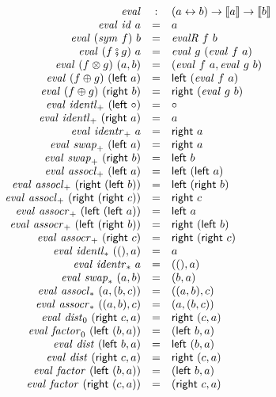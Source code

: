 \documentclass[11pt]{article}
\newcommand{\dt}[1]{\llbracket #1 \rrbracket}
\newcommand{\leftv}[1]{\textsf{left}~#1}
\newcommand{\rightv}[1]{\textsf{right}~#1}
\newcommand{\iso}{\leftrightarrow}
\newcommand{\identlp}{\mathit{identl}_+}
\newcommand{\identrp}{\mathit{identr}_+}
\newcommand{\swapp}{\mathit{swap}_+}
\newcommand{\assoclp}{\mathit{assocl}_+}
\newcommand{\assocrp}{\mathit{assocr}_+}
\newcommand{\identlt}{\mathit{identl}_*}
\newcommand{\identrt}{\mathit{identr}_*}
\newcommand{\swapt}{\mathit{swap}_*}
\newcommand{\assoclt}{\mathit{assocl}_*}
\newcommand{\assocrt}{\mathit{assocr}_*}
\newcommand{\distz}{\mathit{dist}_0}
\newcommand{\factorz}{\mathit{factor}_0}
\newcommand{\dist}{\mathit{dist}}
\newcommand{\factor}{\mathit{factor}}
\newcommand{\idc}{\mathit{id}}
\newcommand{\symc}[1]{\mathit{sym}~#1}
\begin{document}
\[\begin{array}{rcl}
\mathit{eval} &:& (a \iso b) \rightarrow \dt{a} \rightarrow \dt{b} \\
\mathit{eval}~\idc~a &=& a \\
\mathit{eval}~(\symc{f})~b &=& \mathit{evalR}~f~b \\
\mathit{eval}~(f \fatsemi g)~a &=& \mathit{eval}~g~(\mathit{eval}~f~a) \\
\mathit{eval}~(f \otimes g)~(a,b) &=& (\mathit{eval}~f~a, \mathit{eval}~g~b) \\
\mathit{eval}~(f \oplus g)~(\leftv{a}) &=& \leftv{(\mathit{eval}~f~a)} \\
\mathit{eval}~(f \oplus g)~(\rightv{b}) &=& \rightv{(\mathit{eval}~g~b)} \\
\mathit{eval}~\identlp~(\leftv{\circ}) &=& \circ \\
\mathit{eval}~\identlp~(\rightv{a}) &=& a \\
\mathit{eval}~\identrp~a &=& \rightv{a} \\
\mathit{eval}~\swapp~(\leftv{a}) &=& \rightv{a} \\
\mathit{eval}~\swapp~(\rightv{b}) &=& \leftv{b} \\
\mathit{eval}~\assoclp~(\leftv{a}) &=& \leftv{(\leftv{a})} \\
\mathit{eval}~\assoclp~(\rightv{(\leftv{b})}) &=& \leftv{(\rightv{b})} \\
\mathit{eval}~\assoclp~(\rightv{(\rightv{c})}) &=& \rightv{c} \\
\mathit{eval}~\assocrp~(\leftv{(\leftv{a})}) &=& \leftv{a} \\
\mathit{eval}~\assocrp~(\leftv{(\rightv{b})}) &=& \rightv{(\leftv{b})} \\
\mathit{eval}~\assocrp~(\rightv{c}) &=& \rightv{(\rightv{c})} \\
\mathit{eval}~\identlt~((), a) &=& a \\
\mathit{eval}~\identrt~a &=& ((), a) \\
\mathit{eval}~\swapt~(a,b) &=& (b,a) \\
\mathit{eval}~\assoclt~(a,(b,c)) &=& ((a,b),c) \\
\mathit{eval}~\assocrt~((a,b),c)  &=& (a,(b,c)) \\
\mathit{eval}~\distz~(\rightv{c}, a) &=& \rightv{(c, a)} \\
\mathit{eval}~\factorz~(\leftv{(b, a)}) &=& (\leftv{b}, a) \\
\mathit{eval}~\dist~(\leftv{b}, a) &=& \leftv{(b, a)} \\
\mathit{eval}~\dist~(\rightv{c}, a) &=& \rightv{(c, a)} \\
\mathit{eval}~\factor~(\leftv{(b, a)}) &=& (\leftv{b}, a) \\
\mathit{eval}~\factor~(\rightv{(c, a)}) &=& (\rightv{c}, a) \\
\end{array}\]
\end{document}
